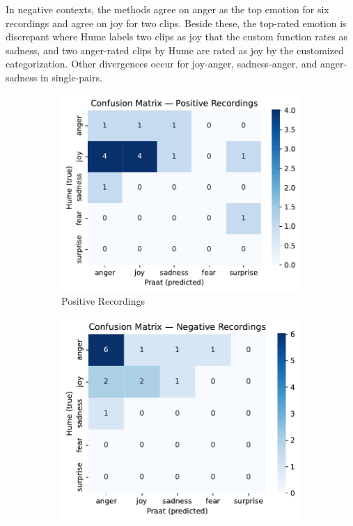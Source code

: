 In negative contexts, the methods agree on anger as the top emotion for six recordings and agree on joy for two clips. 
Beside these, the top-rated emotion is discrepant where Hume labels two clips as joy that the custom function rates as sadness, and two anger-rated clips by Hume are rated as 
joy by the customized categorization. Other divergences occur for joy-anger, sadness-anger, and anger-sadness in single-pairs. 

\begin{figure}[H]
    \centering 
    \begin{subfigure}[b]{0.45\textwidth}
        \includegraphics[width=\textwidth]{png/results/rq1_nr3/confusion_matrix_Positive_Recordings.pdf}
        \caption{Positive Recordings}
        \label{fig:rq1_conf_pos}
    \end{subfigure}
    \begin{subfigure}[b]{0.45\textwidth}
        \includegraphics[width=\textwidth]{png/results/rq1_nr3/confusion_matrix_Negative_Recordings.pdf}

\end{subfigure}
\end{figure}
